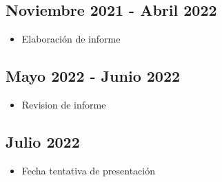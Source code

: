 \documentclass[12pt]{article}
\begin{document}
\subsection*{Noviembre 2021 - Abril 2022}
\begin{itemize}
	\item Elaboración de informe
\end{itemize}

\subsection*{Mayo 2022 - Junio 2022}
\begin{itemize}
	\item Revision de informe
\end{itemize}

\subsection*{Julio 2022}
\begin{itemize}
	\item Fecha tentativa de presentación
\end{itemize}

\newpage
\nocite{*}
\renewcommand{\refname}{Bibliografía}

\end{document}

